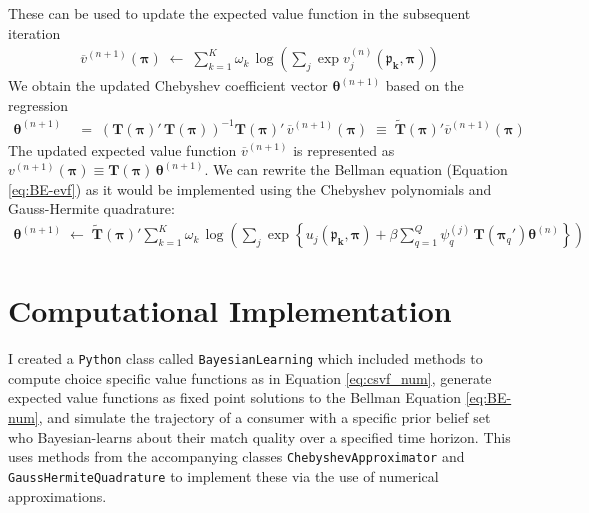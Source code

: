 \documentclass[11pt]{article}
\begin{document}
\noindent These can be used to update the expected value function in the subsequent iteration
\begin{gather}
\overline{v}^{(n+1)}(\boldsymbol{\pi}) \; \longleftarrow \; \sum_{k=1}^K \omega_k \, \log \left(\sum_j \exp   v_j^{(n)}(\mathbf{\boldsymbol{\mathfrak{p}}_k, \boldsymbol{\pi}})   \right) \label{eq:logsumexp}
\end{gather}
We obtain the updated Chebyshev coefficient vector $\boldsymbol{\theta}^{(n+1)}$ based on the regression
\begin{align}
\boldsymbol{\theta}^{(n+1)} \; & = \; \left(\boldsymbol{T}(\boldsymbol{\pi})' \,\boldsymbol{T}(\boldsymbol{\pi})\right)^{-1} \boldsymbol{T}(\boldsymbol{\pi})'\, \overline{v}^{(n+1)}(\boldsymbol{\pi}) \; \equiv \; \widetilde{\boldsymbol{T}}(\boldsymbol{\pi})'  \overline{v}^{(n+1)}(\boldsymbol{\pi}) \label{eq:updated-theta}
\end{align}
The updated expected value function $\overline{v}^{(n+1)}$ is represented as $v^{(n+1)}(\boldsymbol{\pi}) \equiv \boldsymbol{T}(\boldsymbol{\pi}) \, \boldsymbol{\theta}^{(n+1)}$. We can rewrite the Bellman equation (Equation \ref{eq:BE-evf}) as it would be implemented using the Chebyshev polynomials and Gauss-Hermite quadrature:
\begin{gather}
    \boldsymbol{\theta}^{(n+1)}  \; \longleftarrow \; \widetilde{\boldsymbol{T}}(\boldsymbol{\pi})' \sum_{k=1}^K \omega_k \, \log \left(\sum_j \exp  \left\{ u_j(\mathbf{\boldsymbol{\mathfrak{p}}_k, \boldsymbol{\pi}}) + \beta  \sum_{q = 1}^Q  \psi_{q}^{(j)} \, \boldsymbol{T} (\boldsymbol{\pi}_{q}' ) \boldsymbol{\theta}^{(n)}   \right\}  \right) \label{eq:BE-num}
\end{gather}

\section{Computational Implementation}

I created a \verb|Python| class called \verb|BayesianLearning| which included methods to compute choice specific value functions as in Equation \ref{eq:csvf_num}, generate expected value functions as fixed point solutions to the Bellman Equation \ref{eq:BE-num}, and simulate the trajectory of a consumer with a specific prior belief set who Bayesian-learns about their match quality over a specified time horizon. This uses methods from the accompanying classes \verb|ChebyshevApproximator| and \verb|GaussHermiteQuadrature| to implement these via the use of numerical approximations.\\
\end{document}
